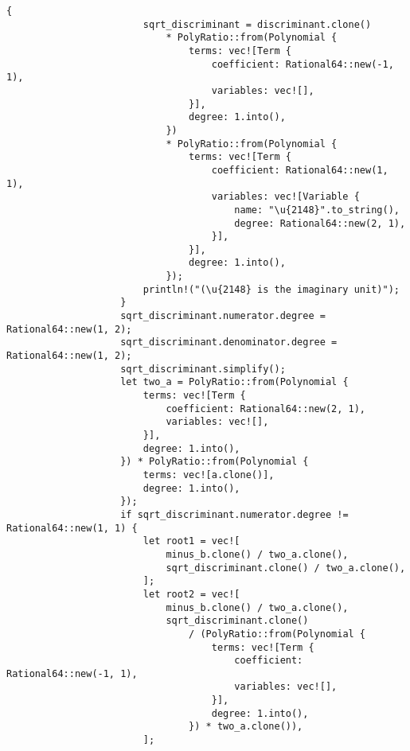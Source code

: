 {\begin{lstlisting}[caption={The implementation of the \texttt{roots()} method for the \texttt{Polynomial} struct}, label={lst:polynomial-roots}]
                    {
                        sqrt_discriminant = discriminant.clone()
                            * PolyRatio::from(Polynomial {
                                terms: vec![Term {
                                    coefficient: Rational64::new(-1, 1),
                                    variables: vec![],
                                }],
                                degree: 1.into(),
                            })
                            * PolyRatio::from(Polynomial {
                                terms: vec![Term {
                                    coefficient: Rational64::new(1, 1),
                                    variables: vec![Variable {
                                        name: "\u{2148}".to_string(),
                                        degree: Rational64::new(2, 1),
                                    }],
                                }],
                                degree: 1.into(),
                            });
                        println!("(\u{2148} is the imaginary unit)");
                    }
                    sqrt_discriminant.numerator.degree = Rational64::new(1, 2);
                    sqrt_discriminant.denominator.degree = Rational64::new(1, 2);
                    sqrt_discriminant.simplify();
                    let two_a = PolyRatio::from(Polynomial {
                        terms: vec![Term {
                            coefficient: Rational64::new(2, 1),
                            variables: vec![],
                        }],
                        degree: 1.into(),
                    }) * PolyRatio::from(Polynomial {
                        terms: vec![a.clone()],
                        degree: 1.into(),
                    });
                    if sqrt_discriminant.numerator.degree != Rational64::new(1, 1) {
                        let root1 = vec![
                            minus_b.clone() / two_a.clone(),
                            sqrt_discriminant.clone() / two_a.clone(),
                        ];
                        let root2 = vec![
                            minus_b.clone() / two_a.clone(),
                            sqrt_discriminant.clone()
                                / (PolyRatio::from(Polynomial {
                                    terms: vec![Term {
                                        coefficient: Rational64::new(-1, 1),
                                        variables: vec![],
                                    }],
                                    degree: 1.into(),
                                }) * two_a.clone()),
                        ];

\end{lstlisting}}
